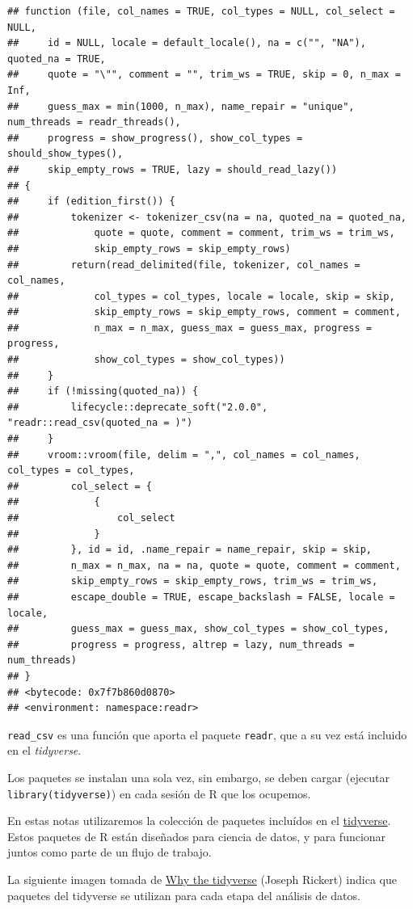 \documentclass[
]{book}
\begin{document}
\begin{verbatim}
## function (file, col_names = TRUE, col_types = NULL, col_select = NULL, 
##     id = NULL, locale = default_locale(), na = c("", "NA"), quoted_na = TRUE, 
##     quote = "\"", comment = "", trim_ws = TRUE, skip = 0, n_max = Inf, 
##     guess_max = min(1000, n_max), name_repair = "unique", num_threads = readr_threads(), 
##     progress = show_progress(), show_col_types = should_show_types(), 
##     skip_empty_rows = TRUE, lazy = should_read_lazy()) 
## {
##     if (edition_first()) {
##         tokenizer <- tokenizer_csv(na = na, quoted_na = quoted_na, 
##             quote = quote, comment = comment, trim_ws = trim_ws, 
##             skip_empty_rows = skip_empty_rows)
##         return(read_delimited(file, tokenizer, col_names = col_names, 
##             col_types = col_types, locale = locale, skip = skip, 
##             skip_empty_rows = skip_empty_rows, comment = comment, 
##             n_max = n_max, guess_max = guess_max, progress = progress, 
##             show_col_types = show_col_types))
##     }
##     if (!missing(quoted_na)) {
##         lifecycle::deprecate_soft("2.0.0", "readr::read_csv(quoted_na = )")
##     }
##     vroom::vroom(file, delim = ",", col_names = col_names, col_types = col_types, 
##         col_select = {
##             {
##                 col_select
##             }
##         }, id = id, .name_repair = name_repair, skip = skip, 
##         n_max = n_max, na = na, quote = quote, comment = comment, 
##         skip_empty_rows = skip_empty_rows, trim_ws = trim_ws, 
##         escape_double = TRUE, escape_backslash = FALSE, locale = locale, 
##         guess_max = guess_max, show_col_types = show_col_types, 
##         progress = progress, altrep = lazy, num_threads = num_threads)
## }
## <bytecode: 0x7f7b860d0870>
## <environment: namespace:readr>
\end{verbatim}

\texttt{read\_csv} es una función que aporta el paquete \texttt{readr}, que a su vez está incluido en el
\emph{tidyverse}.

Los paquetes se instalan una sola vez, sin embargo, se deben cargar
(ejecutar \texttt{library(tidyverse)}) en cada sesión de R que los ocupemos.

En estas notas utilizaremos la colección de paquetes incluídos en el
\href{https://www.tidyverse.org/}{tidyverse}. Estos paquetes de R están
diseñados para ciencia de datos, y para funcionar juntos como parte de un flujo
de trabajo.

La siguiente imagen tomada de \href{https://rviews.rstudio.com/2017/06/08/what-is-the-tidyverse/}{Why the tidyverse} (Joseph
Rickert) indica que paquetes del tidyverse se utilizan para cada
etapa del análisis de datos.
\end{document}
